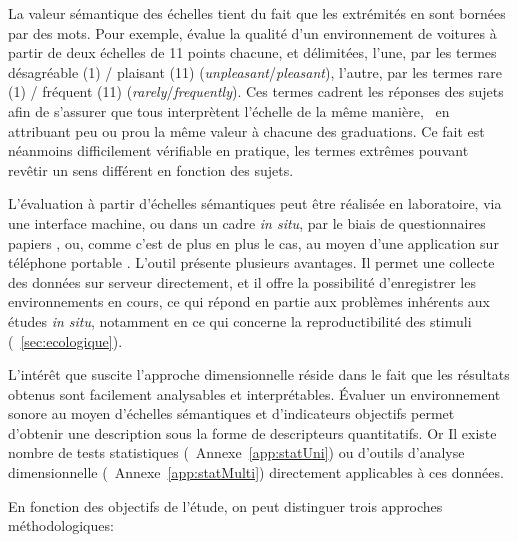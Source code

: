 La valeur sémantique des échelles tient du fait que les extrémités en sont bornées par des mots. Pour exemple, \citep{ricciardi2015sound} évalue la qualité d'un environnement  de voitures à partir de deux échelles de 11 points chacune, et délimitées, l'une, par les termes désagréable (1) / plaisant (11) (\emph{unpleasant}/\emph{pleasant}), l'autre, par les termes rare (1) / fréquent (11) (\emph{rarely}/\emph{frequently}). Ces termes cadrent les réponses des sujets afin de s'assurer que tous interprètent l'échelle de la même manière, \ie~en attribuant  peu ou prou la même valeur à chacune des graduations. Ce fait est néanmoins difficilement vérifiable en pratique, les termes extrêmes pouvant revêtir un sens différent en fonction des sujets.

L'évaluation à partir d'échelles sémantiques peut être réalisée en laboratoire, via une interface machine, ou dans un cadre \emph{in situ}, par le biais de questionnaires papiers \citep{jeon2013soundwalk,torija2013application}, ou, comme c'est de plus en plus le cas, au moyen d'une application sur téléphone portable \citep{kardous2014evaluation,ricciardi2015sound}. L'outil présente plusieurs avantages. Il permet une collecte des données sur serveur directement, et il offre la possibilité d'enregistrer les environnements en cours, ce qui répond en partie aux problèmes inhérents aux études \emph{in situ}, notamment en ce qui concerne la reproductibilité des stimuli (\Cf~\ref{sec:ecologique}).

L'intérêt que suscite l'approche dimensionnelle réside dans le fait que les résultats obtenus sont facilement analysables et interprétables. Évaluer un environnement sonore au moyen d'échelles sémantiques et d'indicateurs objectifs permet d'obtenir une description sous la forme de descripteurs quantitatifs. Or Il existe nombre de tests statistiques (\Cf~Annexe~\ref{app:statUni}) ou d'outils d'analyse dimensionnelle (\Cf~Annexe~\ref{app:statMulti}) directement applicables à ces données.

En fonction des objectifs de l'étude, on peut distinguer trois approches méthodologiques:

